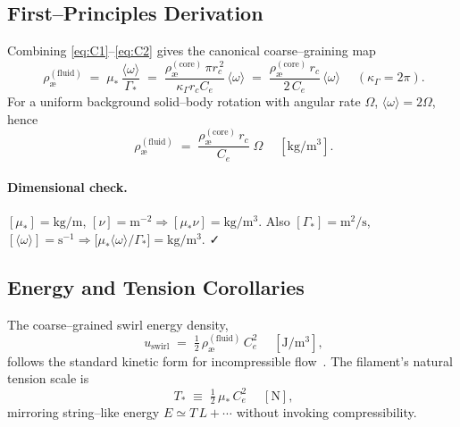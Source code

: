 \documentclass[11pt, a4paper]{article}
\begin{document}
\subsection{First–Principles Derivation}
Combining \eqref{eq:C1}–\eqref{eq:C2} gives the canonical coarse–graining map
\begin{equation}
    \boxed{\;
    \rho_{\text{\ae}}^{(\text{fluid})}
        \;=\; \mu_\ast\,\frac{\langle\omega\rangle}{\Gamma_\ast}
        \;=\; \frac{\rho_{\text{\ae}}^{(\text{core})}\,\pi r_c^{\,2}}{\kappa_\Gamma r_c C_e}\,\langle\omega\rangle
        \;=\; \frac{\rho_{\text{\ae}}^{(\text{core})}\,r_c}{2\,C_e}\,\langle\omega\rangle
        \;}
    \quad (\kappa_\Gamma=2\pi).
    \label{eq:rho_from_omega}
\end{equation}
For a uniform background solid–body rotation with angular rate \(\Omega\), \(\langle\omega\rangle=2\Omega\), hence
\begin{equation}
    \boxed{\;
    \rho_{\text{\ae}}^{(\text{fluid})}
        \;=\; \frac{\rho_{\text{\ae}}^{(\text{core})}\,r_c}{C_e}\;\Omega
        \;}
    \quad [\mathrm{kg/m^3}].
    \label{eq:rho_from_Omega}
\end{equation}

\paragraph{Dimensional check.}
\([\mu_\ast]=\mathrm{kg/m}\), \([\nu]=\mathrm{m^{-2}}\Rightarrow [\mu_\ast\nu]=\mathrm{kg/m^3}\).
Also \([\Gamma_\ast]=\mathrm{m^2/s}\), \([\langle\omega\rangle]=\mathrm{s^{-1}}\Rightarrow
\bigl[\mu_\ast\langle\omega\rangle/\Gamma_\ast\bigr]=\mathrm{kg/m^3}\). ✓

\subsection{Energy and Tension Corollaries}
The coarse–grained swirl energy density,
\begin{equation}
    \boxed{\;
    u_{\text{swirl}} \;=\; \tfrac12\,\rho_{\text{\ae}}^{(\text{fluid})}\,C_e^2
    \;}
    \quad [\mathrm{J/m^3}],
    \label{eq:energy_density}
\end{equation}
follows the standard kinetic form for incompressible flow~\cite{LandauLifshitzFM,Saffman1992}. The filament’s natural tension scale is
\begin{equation}
    \boxed{\;
    T_\ast \;\equiv\; \tfrac12\,\mu_\ast\,C_e^2
    \;}
    \quad [\mathrm{N}],
    \label{eq:string_tension}
\end{equation}
mirroring string–like energy \(E\simeq T\,L+\cdots\) without invoking compressibility.
\end{document}
